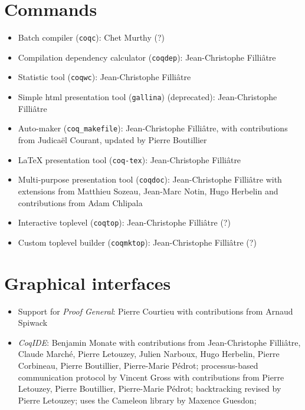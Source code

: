 \documentclass{article}
\begin{document}
\section{Commands}

\begin{itemize}
\item Batch compiler (\texttt{coqc}):  Chet Murthy (?)
\item Compilation dependency calculator (\texttt{coqdep}):
  Jean-Christophe Filliâtre
\item Statistic tool (\texttt{coqwc}): Jean-Christophe Filliâtre
\item Simple html presentation tool (\texttt{gallina}) (deprecated): Jean-Christophe Filliâtre
\item Auto-maker (\texttt{coq\_makefile}): Jean-Christophe Filliâtre,
  with contributions from Judicaël Courant, updated by Pierre Boutillier
\item LaTeX presentation tool (\texttt{coq-tex}): Jean-Christophe Filliâtre
\item Multi-purpose presentation tool (\texttt{coqdoc}): Jean-Christophe Filliâtre with extensions from
  Matthieu Sozeau, Jean-Marc Notin, Hugo Herbelin and contributions from Adam Chlipala
\item Interactive toplevel (\texttt{coqtop}): Jean-Christophe Filliâtre (?)
\item Custom toplevel builder (\texttt{coqmktop}): Jean-Christophe Filliâtre (?)
\end{itemize}

\section{Graphical interfaces}

\begin{itemize}
\item Support for {\em Proof General}: Pierre Courtieu with contributions from Arnaud Spiwack
\item {\em CoqIDE}: Benjamin Monate with contributions from
  Jean-Christophe Filliâtre, Claude Marché, Pierre Letouzey, Julien
  Narboux, Hugo Herbelin, Pierre Corbineau, Pierre Boutillier,
  Pierre-Marie Pédrot; processus-based communication protocol by
  Vincent Gross with contributions from Pierre Letouzey, Pierre
  Boutillier, Pierre-Marie Pédrot; backtracking revised by Pierre
  Letouzey; uses the Cameleon library by Maxence Guesdon;
\end{itemize}
\end{document}
